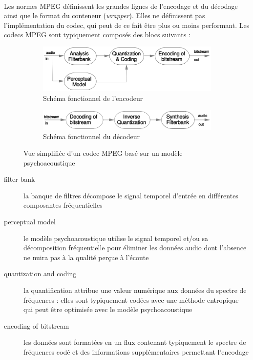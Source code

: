 \documentclass{article}
\begin{document}
    \paragraph{}
    Les normes MPEG définissent les grandes lignes de l'encodage et du décodage ainsi que le format du conteneur (\emph{wrapper}). Elles ne définissent pas l'implémentation du codec, qui peut de ce fait être plus ou moins performant. Les codecs MPEG sont typiquement composés des blocs suivants\cite{1999-Brandenburg} :
    \begin{figure}[H]
        \centering
        \begin{subfigure}[b]{.6\linewidth}
            \includegraphics[width=\linewidth]{./images/1999-Brandenburg-simple-AAC-encoder.png}
            \caption{Schéma fonctionnel de l'encodeur}
        \end{subfigure}
        \begin{subfigure}[b]{.6\linewidth}
            \includegraphics[width=\linewidth]{./images/1999-Brandenburg-simple-AAC-decoder.png}
            \caption{Schéma fonctionnel du décodeur}
        \end{subfigure}
        \caption{Vue simplifiée d'un codec MPEG basé sur un modèle psychoacoustique}
    \end{figure}
    \begin{description}
        \item[filter bank] la banque de filtres décompose le signal temporel d'entrée en différentes composantes fréquentielles
        \item[perceptual model] le modèle psychoacoustique utilise le signal temporel et/ou sa décomposition fréquentielle pour éliminer les données audio dont l'absence ne nuira pas à la qualité perçue à l'écoute
        \item[quantization and coding] la quantification attribue une valeur numérique aux données du spectre de fréquences : elles sont typiquement codées avec une méthode entropique qui peut être optimisée avec le modèle psychoacoustique
        \item[encoding of bitstream] les données sont formatées en un flux contenant typiquement le spectre de fréquences codé et des informations supplémentaires permettant l'encodage
    \end{description}
    
\end{document}
